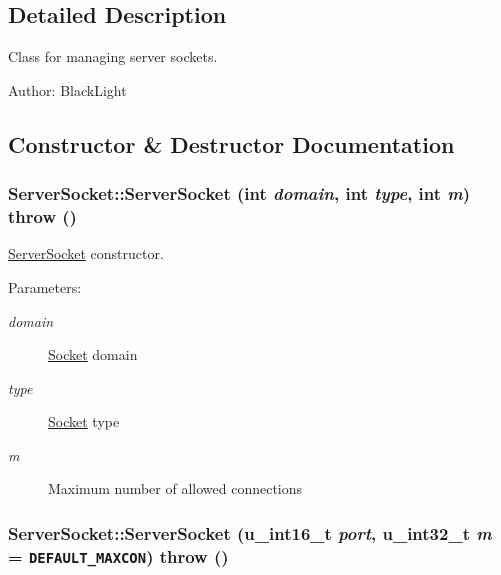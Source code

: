\subsection{Detailed Description}
Class for managing server sockets. 

\begin{Desc}
\item[Author:]BlackLight \end{Desc}


\subsection{Constructor \& Destructor Documentation}
\hypertarget{classServerSocket_81dab62f8db79ce3e9bf0c6ea2e4799d}{
\subsubsection[{ServerSocket}]{\setlength{\rightskip}{0pt plus 5cm}ServerSocket::ServerSocket (int {\em domain}, \/  int {\em type}, \/  int {\em m})  throw ()}}
\label{classServerSocket_81dab62f8db79ce3e9bf0c6ea2e4799d}


\hyperlink{classServerSocket}{ServerSocket} constructor. 

\begin{Desc}
\item[Parameters:]
\begin{description}
\item[{\em domain}]\hyperlink{classSocket}{Socket} domain \item[{\em type}]\hyperlink{classSocket}{Socket} type \item[{\em m}]Maximum number of allowed connections \end{description}
\end{Desc}
\hypertarget{classServerSocket_4300657777580374a86d1d25ac3318cd}{
\subsubsection[{ServerSocket}]{\setlength{\rightskip}{0pt plus 5cm}ServerSocket::ServerSocket (u\_\-int16\_\-t {\em port}, \/  u\_\-int32\_\-t {\em m} = {\tt DEFAULT\_\-MAXCON})  throw ()}}
\label{classServerSocket_4300657777580374a86d1d25ac3318cd}


